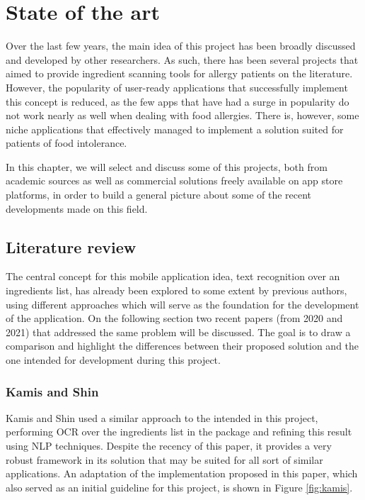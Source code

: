 \chapter{State of the art}
\label{chapter2}

Over the last few years, the main idea of this project has been broadly discussed and developed by other researchers. As such, there has been several projects that aimed to provide ingredient scanning tools for allergy patients on the literature. However, the popularity of user-ready applications that successfully implement this concept is reduced, as the few apps that have had a surge in popularity do not work nearly as well when dealing with food allergies. There is, however, some niche applications that effectively managed to implement a solution suited for patients of food intolerance.

In this chapter, we will select and discuss some of this projects, both from academic sources as well as commercial solutions freely available on app store platforms, in order to build a general picture about some of the recent developments made on this field.

\section{Literature review}

The central concept for this mobile application idea, text recognition over an ingredients list, has already been explored to some extent by previous authors, using different approaches which will serve as the foundation for the development of the application. On the following section two recent papers (from 2020 and 2021) that addressed the same problem will be discussed. The goal is to draw a comparison and highlight the differences between their proposed solution and the one intended for development during this project.

\subsection{Kamis and Shin}

Kamis and Shin \cite{putri_kamis_ocr-based_2020} used a similar approach to the intended in this project, performing OCR over the ingredients list in the package and refining this result using NLP techniques. Despite the recency of this paper, it provides a very robust framework in its solution that may be suited for all sort of similar applications. An adaptation of the implementation proposed in this paper, which also served as an initial guideline for this project, is shown in Figure \ref{fig:kamis}.

